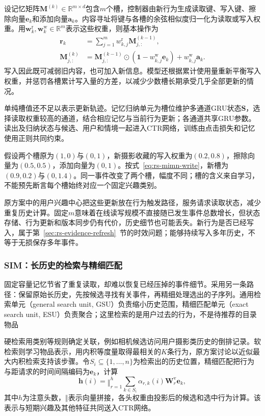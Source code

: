 设记忆矩阵$\bm{M}^{(k)}\in\mathbb{R}^{m\times d}$包含$m$个槽，控制器由新行为生成读取键、写入键、擦除向量$\bm{e}_k$和添加向量$\bm{a}_k$。内容寻址将键与各槽的余弦相似度归一化为读取或写入权重。用$\bm{w}^{\mathrm{r}}_k,\bm{w}^{\mathrm{w}}_k\in\mathbb{R}^m$表示这些权重，则基本操作为
\begin{align}
  \bm{r}_k&=\sum_{j=1}^{m}w^{\mathrm{r}}_{k,j}\bm{M}^{(k-1)}_{j,:},\\
  \bm{M}^{(k)}_{j,:}
    &=\bm{M}^{(k-1)}_{j,:}\odot
        (\bm{1}-w^{\mathrm{w}}_{k,j}\bm{e}_k)
       +w^{\mathrm{w}}_{k,j}\bm{a}_k.
  \label{eq:rs-mimn-write}
\end{align}
写入因此既可减弱旧内容，也可加入新信息。模型还根据累计使用量重新平衡写入权重，并惩罚各槽累计写入量的方差，以减少少数槽长期承受几乎全部更新的情况。

单纯槽值还不足以表示更新轨迹。记忆归纳单元为槽位维护多通道GRU状态$\bm{S}$，选择读取权重较高的通道，结合相应记忆与当前行为更新；各通道共享GRU参数。读出及归纳状态与候选、用户和情境一起进入CTR网络，训练由点击损失和记忆使用正则共同约束。

假设两个槽原为$(1,0)$与$(0,1)$，新摄影收藏的写入权重为$(0.2,0.8)$，擦除向量为$(0.5,0.5)$，添加向量为$(0,1)$。按式~\eqref{eq:rs-mimn-write}，新槽为$(0.9,0.2)$与$(0,1.4)$。同一事件改变了两个槽，幅度不同；槽的含义来自学习，不能预先断言每个槽始终对应一个固定兴趣类别。

原方案中的用户兴趣中心把这些更新放在行为触发路径，服务请求读取状态，减少重复历史计算。固定$m$意味着在线读写规模不直接随已发生事件总数增长，但状态存储、行为更新和版本同步仍有代价，历史细节也可能丢失。新行为是否已经写入，属于第~\ref{sec:rs-evidence-refresh}~节的时效问题；能够持续写入多年历史，不等于无损保存多年事件。

\subsubsection{SIM：长历史的检索与精细匹配}
\label{sec:rs-sim}

固定容量记忆节省了重复读取，却难以恢复已经压掉的事件细节。采用另一条路径：保留原始长历史，先按候选寻找有关事件，再精细处理选出的子序列。通用检索单元（general search unit, GSU）负责缩小历史范围，精细匹配单元（exact search unit, ESU）负责聚合；这里检索的是用户过去的行为，不是待推荐的目录物品

硬检索用类别等规则确定关联，例如相机候选访问用户摄影类历史的倒排记录。软检索则学习物品表示，用内积等度量取得最相关的$K$条行为，原方案讨论以近似最大内积检索支持该步骤。令$S_i\subseteq\{1,\ldots,n\}$为检索出的历史位置，精细匹配把行为与距请求的时间间隔编码为$\bm{e}_k$，计算
\begin{equation}
  \bm{h}(i)=\mathop{\Vert}_{r=1}^{h}
   \sum_{k\in S_i}\alpha_{r,k}(i)\bm{W}^{\mathrm{v}}_r\bm{e}_k,
  \label{eq:rs-sim-interest}
\end{equation}
其中$h$为注意头数，$\Vert$表示向量拼接，各头权重由投影后的候选和选中行为计算。该表示与短期兴趣及其他特征共同送入CTR网络。

